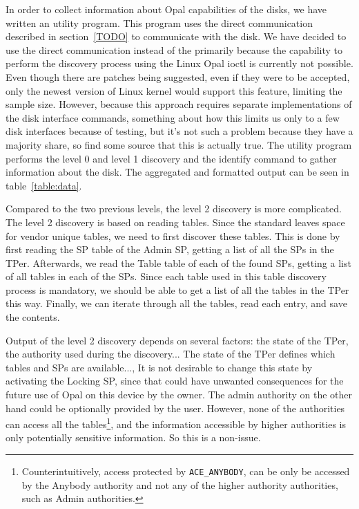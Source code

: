 In order to collect information about Opal capabilities of the disks, we have written an utility program. This program uses the direct communication described in section~\ref{TODO} to communicate with the disk. We have decided to use the direct communication instead of the primarily because the capability to perform the discovery process using the Linux Opal ioctl is currently not possible. Even though there are patches being suggested, even if they were to be accepted, only the newest version of Linux kernel would support this feature, limiting the sample size.
However, because this approach requires separate implementations of the disk interface commands, something about how this limits us only to a few disk interfaces because of testing, but it's not such a problem because they have a majority share, so find some source that this is actually true.
The utility program performs the level 0 and level 1 discovery and the identify command to gather information about the disk.
The aggregated and formatted output can be seen in table~\ref{table:data}.

Compared to the two previous levels, the level 2 discovery is more complicated. The level 2 discovery is based on reading tables. Since the standard leaves space for vendor unique tables, we need to first discover these tables. This is done by first reading the SP table of the Admin SP, getting a list of all the SPs in the TPer. Afterwards, we read the Table table of each of the found SPs, getting a list of all tables in each of the SPs. Since each table used in this table discovery process is mandatory, we should be able to get a list of all the tables in the TPer this way. Finally, we can iterate through all the tables, read each entry, and save the contents.

Output of the level 2 discovery depends on several factors: the state of the TPer, the authority used during the discovery...
The state of the TPer defines which tables and SPs are available..., It is not desirable to change this state by activating the Locking SP, since that could have unwanted consequences for the future use of Opal on this device by the owner.
The admin authority on the other hand could be optionally provided by the user. However, none of the authorities can access all the tables\footnote{Counterintuitively, access protected by \texttt{ACE\_ANYBODY}, can be only be accessed by the Anybody authority and not any of the higher authority authorities, such as Admin authorities.}, and the information accessible by higher authorities is only potentially sensitive information. So this is a non-issue.

